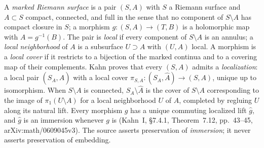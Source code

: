 \begin{definition}\label{def:localization-seed}
A \emph{marked Riemann surface} is a pair \((S,A)\) with \(S\) a Riemann surface and \(A\subset S\) compact, connected, and full in the sense that no component of \(S\setminus A\) has compact closure in \(S\); a morphism \(g\colon(S,A)\to(T,B)\) is a holomorphic map with \(A=g^{-1}(B)\).  The pair is \emph{local} if every component of \(S\setminus A\) is an annulus; a \emph{local neighborhood} of \(A\) is a subsurface \(U\supset A\) with \((U,A)\) local.  A morphism is a \emph{local cover} if it restricts to a bijection of the marked continua and to a covering map of their complements.  Kahn proves that every \((S,A)\) admits a \emph{localization}: a local pair \((S_A,\widehat A)\) with a local cover \(\pi_{S,A}\colon(S_A,\widehat A)\to(S,A)\), unique up to isomorphism.  When \(S\setminus A\) is connected, \(S_A\setminus\widehat A\) is the cover of \(S\setminus A\) corresponding to the image of \(\pi_1(U\setminus A)\) for a local neighborhood \(U\) of \(A\), completed by regluing \(U\) along its natural lift.  Every morphism \(g\) has a unique commuting localized lift \(\widehat g\), and \(\widehat g\) is an immersion whenever \(g\) is (Kahn~I, \S7.4.1, Theorem~7.12, pp.~43--45, arXiv:math/0609045v3).  The source asserts preservation of \emph{immersion}; it never asserts preservation of embedding.
\end{definition}

